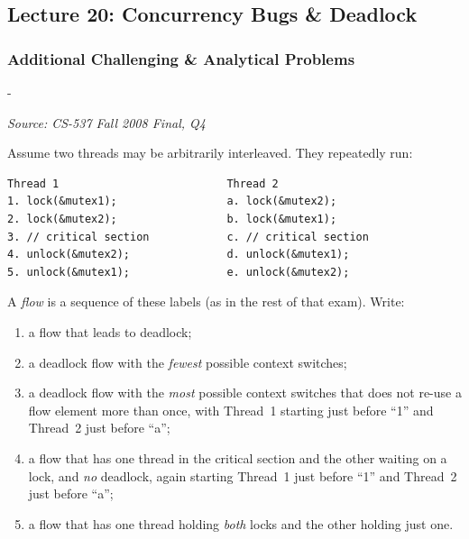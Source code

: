 \documentclass[11pt,a4paper]{article}
\makeatletter
\newcommand{\keepspace}[1]{\par\penalty-100\begingroup
  \setlength{\dimen@}{#1}\dimen@ii\pagegoal\advance\dimen@ii-\pagetotal
  \ifdim\dimen@>\dimen@ii\ifdim\dimen@ii>\z@\vfil\fi\break\fi\endgroup}
\newcounter{qn}[section]
\newenvironment{Qn}[4]{%
  \refstepcounter{qn}\keepspace{7\baselineskip}%
  \begin{tcolorbox}[qboxstyle, title={Q\thesection.\theqn\ \ [#1 \textbar\ #2]\ \ #4}]%
  {\footnotesize\color{g3}\textit{Source: #3}}\par\smallskip%
}{%
  \end{tcolorbox}%
}
\makeatother
\begin{document}
\subsection{Lecture 20: Concurrency Bugs \& Deadlock}

\subsubsection*{Additional Challenging \& Analytical Problems}

\begin{Qn}{Hard}{Lect 20}{CS-537 Fall 2008 Final, Q4}{Deadlock flows: two threads, inverted mutex pair}
Assume two threads may be arbitrarily interleaved. They repeatedly run:
\begin{lstlisting}[numbers=none]
Thread 1                          Thread 2
1. lock(&mutex1);                 a. lock(&mutex2);
2. lock(&mutex2);                 b. lock(&mutex1);
3. // critical section            c. // critical section
4. unlock(&mutex2);               d. unlock(&mutex1);
5. unlock(&mutex1);               e. unlock(&mutex2);
\end{lstlisting}
A \emph{flow} is a sequence of these labels (as in the rest of that exam).
Write:
\begin{enumerate}
  \item[(a)] a flow that leads to deadlock;
  \item[(b)] a deadlock flow with the \emph{fewest} possible context
        switches;
  \item[(c)] a deadlock flow with the \emph{most} possible context switches
        that does not re-use a flow element more than once, with Thread~1
        starting just before ``1'' and Thread~2 just before ``a'';
  \item[(d)] a flow that has one thread in the critical section and the
        other waiting on a lock, and \emph{no} deadlock, again starting
        Thread~1 just before ``1'' and Thread~2 just before ``a'';
  \item[(e)] a flow that has one thread holding \emph{both} locks and the
        other holding just one.
\end{enumerate}
\end{Qn}
\end{document}
